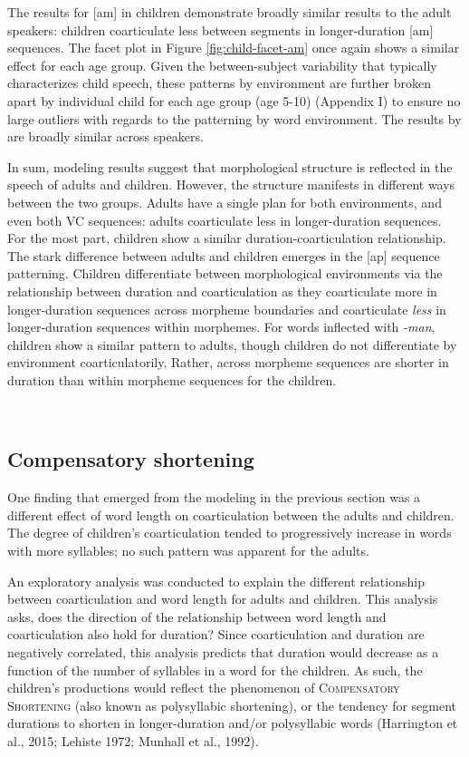 \documentclass[
]{article}
\begin{document}
The results for {[}am{]} in children demonstrate broadly similar results to the adult speakers: children coarticulate less between segments in longer-duration {[}am{]} sequences. The facet plot in Figure \ref{fig:child-facet-am} once again shows a similar effect for each age group. Given the between-subject variability that typically characterizes child speech, these patterns by environment are further broken apart by individual child for each age group (age 5-10) (Appendix I) to ensure no large outliers with regards to the patterning by word environment. The results by are broadly similar across speakers.

In sum, modeling results suggest that morphological structure is reflected in the speech of adults and children. However, the structure manifests in different ways between the two groups. Adults have a single plan for both environments, and even both VC sequences: adults coarticulate less in longer-duration sequences. For the most part, children show a similar duration-coarticulation relationship. The stark difference between adults and children emerges in the {[}ap{]} sequence patterning. Children differentiate between morphological environments via the relationship between duration and coarticulation as they coarticulate more in longer-duration sequences across morpheme boundaries and coarticulate \emph{less} in longer-duration sequences within morphemes. For words inflected with \emph{-man}, children show a similar pattern to adults, though children do not differentiate by environment coarticulatorily. Rather, across morpheme sequences are shorter in duration than within morpheme sequences for the children.

~
~

\hypertarget{compensatory-shortening}{%
\subsection{Compensatory shortening}\label{compensatory-shortening}}

One finding that emerged from the modeling in the previous section was a different effect of word length on coarticulation between the adults and children. The degree of children's coarticulation tended to progressively increase in words with more syllables; no such pattern was apparent for the adults.

An exploratory analysis was conducted to explain the different relationship between coarticulation and word length for adults and children. This analysis asks, does the direction of the relationship between word length and coarticulation also hold for duration? Since coarticulation and duration are negatively correlated, this analysis predicts that duration would decrease as a function of the number of syllables in a word for the children. As such, the children's productions would reflect the phenomenon of \textsc{Compensatory Shortening} (also known as polysyllabic shortening), or the tendency for segment durations to shorten in longer-duration and/or polysyllabic words (Harrington et al., 2015; Lehiste 1972; Munhall et al., 1992).
\end{document}
